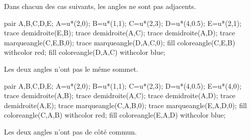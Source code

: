\begin{changemargin}{0mm}{-25mm}
   \begin{remarques}
   Dans chacun des cas suivants, les angles ne sont pas adjacents.
      \begin{changemargin}{-10mm}{-10mm}
         \begin{minipage}{0.25\linewidth}
            \begin{center}
               \begin{Geometrie}[CoinHD={(4.5u,3.5u)}]
                  pair A,B,C,D,E;
                  A=u*(2,0);
                  B=u*(1,1);
                  C=u*(2,3);
                  D=u*(4,0.5);
                  E=u*(2,1);
                  trace demidroite(E,B);
                  trace demidroite(A,C);
                  trace demidroite(A,D);
                  trace marqueangle(C,E,B,0);
                  trace marqueangle(D,A,C,0);
                  fill coloreangle(C,E,B) withcolor red;
                  fill coloreangle(D,A,C) withcolor blue;
               \end{Geometrie}
               \par
               Les deux angles n'ont pas le même sommet. 
            \end{center}
         \end{minipage}
         \hfill
         \begin{minipage}{0.25\linewidth}
            \begin{center}
               \begin{Geometrie}[CoinHD={(4.5u,3.5u)}]
                  pair A,B,C,D,E;
                  A=u*(2,0);
                  B=u*(1,1);
                  C=u*(2,3);
                  D=u*(4,0.5);
                  E=u*(4,0);
                  trace demidroite(A,B);
                  trace demidroite(A,C);
                  trace demidroite(A,D);
                  trace demidroite(A,E);
                  trace marqueangle(C,A,B,0);
                  trace marqueangle(E,A,D,0);
                  fill coloreangle(C,A,B) withcolor red;
                  fill coloreangle(E,A,D) withcolor blue;
               \end{Geometrie}
               \par
               Les deux angles n'ont pas de côté commun. 
            \end{center}
         \end{minipage}
         \hfill
         \begin{minipage}{0.4\linewidth}
            \begin{center}
               \begin{Geometrie}[CoinHD={(5u,4.3u)}]

\end{Geometrie}
\end{center}
\end{minipage}
\end{changemargin}
\end{remarques}
\end{changemargin}
